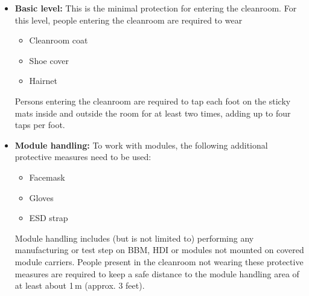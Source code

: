 \documentclass[12pt]{unlsilabsop}
\begin{document}
\begin{itemize}
    \item \textbf{Basic level:} This is the minimal protection for entering the cleanroom. For this level, people entering the cleanroom are required to wear
    \begin{itemize}
	\item Cleanroom coat
	\item Shoe cover
	\item Hairnet
    \end{itemize}
    Persons entering the cleanroom are required to tap each foot on the sticky mats inside and outside the room for at least two times, adding up to four taps per foot.
    \item \textbf{Module handling:} To work with modules, the following additional protective measures need to be used:
    \begin{itemize}
	\item Facemask
	\item Gloves
	\item ESD strap
    \end{itemize}
    Module handling includes (but is not limited to) performing any manufacturing or test step on BBM, HDI or modules not mounted on covered module carriers. People present in the cleanroom not wearing these protective measures are required to keep a safe distance to the module handling area of at least about 1\,m (approx. 3 feet).
\end{itemize}
\end{document}
